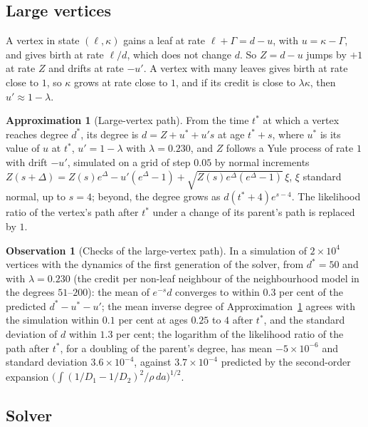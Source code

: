 \documentclass[11pt]{article}
\theoremstyle{plain}
\theoremstyle{definition}
\newtheorem{approximation}[theorem]{Approximation}
\newtheorem{observation}[theorem]{Observation}
\theoremstyle{remark}
\begin{document}
\subsection{Large vertices}

A vertex in state $(\ell,\kappa)$ gains a leaf at rate $\ell+\Gamma=d-u$, with $u=\kappa-\Gamma$, and gives birth at rate $\ell/d$, which does not change $d$. So $Z=d-u$ jumps by $+1$ at rate $Z$ and drifts at rate $-u'$. A vertex with many leaves gives birth at rate close to $1$, so $\kappa$ grows at rate close to $1$, and if its credit is close to $\lambda\kappa$, then $u'\approx1-\lambda$.

\begin{approximation}[Large-vertex path]\label{app:large}
From the time $t^*$ at which a vertex reaches degree $d^*$, its degree is $d=Z+u^*+u's$ at age $t^*+s$, where $u^*$ is its value of $u$ at $t^*$, $u'=1-\lambda$ with $\lambda=0.230$, and $Z$ follows a Yule process of rate $1$ with drift $-u'$, simulated on a grid of step $0.05$ by normal increments $Z(s+\Delta)=Z(s)e^\Delta-u'(e^\Delta-1)+\sqrt{Z(s)e^\Delta(e^\Delta-1)}\,\xi$, $\xi$ standard normal, up to $s=4$; beyond, the degree grows as $d(t^*+4)e^{s-4}$. The likelihood ratio of the vertex's path after $t^*$ under a change of its parent's path is replaced by $1$.
\end{approximation}

\begin{observation}[Checks of the large-vertex path]\label{obs:large}
In a simulation of $2\times10^4$ vertices with the dynamics of the first generation of the solver, from $d^*=50$ and with $\lambda=0.230$ (the credit per non-leaf neighbour of the neighbourhood model in the degrees $51$--$200$): the mean of $e^{-s}d$ converges to within $0.3$ per cent of the predicted $d^*-u^*-u'$; the mean inverse degree of Approximation~\ref{app:large} agrees with the simulation within $0.1$ per cent at ages $0.25$ to $4$ after $t^*$, and the standard deviation of $d$ within $1.3$ per cent; the logarithm of the likelihood ratio of the path after $t^*$, for a doubling of the parent's degree, has mean $-5\times10^{-6}$ and standard deviation $3.6\times10^{-4}$, against $3.7\times10^{-4}$ predicted by the second-order expansion $\bigl(\int(1/D_1-1/D_2)^2/\rho\,da\bigr)^{1/2}$.
\end{observation}

\subsection{Solver}
\end{document}
